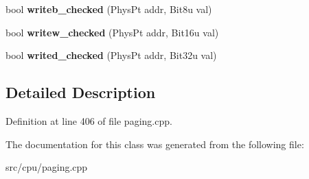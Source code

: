 \begin{DoxyCompactItemize}
\item 
\hypertarget{classExceptionPageHandler_abc7754d99460d1f95bf95a6dcf02e309}{bool {\bfseries writeb\-\_\-checked} (Phys\-Pt addr, Bit8u val)}\label{classExceptionPageHandler_abc7754d99460d1f95bf95a6dcf02e309}

\item 
\hypertarget{classExceptionPageHandler_a69bba76e85b244d0abc665beb4f2be0a}{bool {\bfseries writew\-\_\-checked} (Phys\-Pt addr, Bit16u val)}\label{classExceptionPageHandler_a69bba76e85b244d0abc665beb4f2be0a}

\item 
\hypertarget{classExceptionPageHandler_a87641e5ad46e2aefeb1e0ab54406ba75}{bool {\bfseries writed\-\_\-checked} (Phys\-Pt addr, Bit32u val)}\label{classExceptionPageHandler_a87641e5ad46e2aefeb1e0ab54406ba75}

\end{DoxyCompactItemize}


\subsection{Detailed Description}


Definition at line 406 of file paging.\-cpp.



The documentation for this class was generated from the following file\-:\begin{DoxyCompactItemize}
\item 
src/cpu/paging.\-cpp\end{DoxyCompactItemize}
